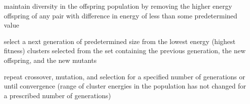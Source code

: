 \begin{description}
\begin{description}
    \end{description}
  \item[\req{6}] maintain diversity in the offspring population by removing the higher energy offspring of any pair with
    difference in energy of less than some predetermined value
  \item[\req{7}] select a next generation of predetermined size from the lowest energy (highest fitness) 
    clusters selected from the set containing the previous generation, the new offspring, and the new mutants
  \item[\req{8}] repeat crossover, mutation, and selection for a specified number of generations or until convergence
    (range of cluster energies in the population has not changed for a prescribed number of generations)
\end{description}

